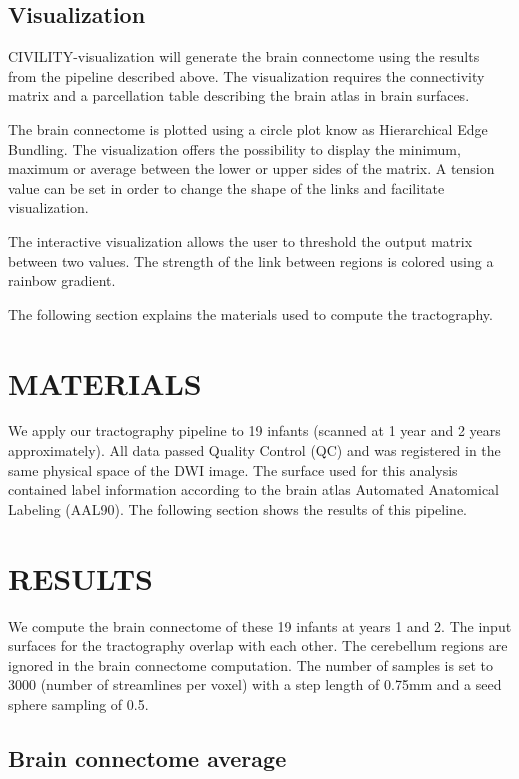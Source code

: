 \documentclass[]{spie}  %
\begin{document}
\subsection{Visualization}

CIVILITY-visualization will generate the brain connectome using the results from the pipeline described above.
The visualization requires the connectivity matrix and a parcellation table describing the brain atlas in brain surfaces. 

The brain connectome is plotted using a circle plot know as Hierarchical Edge Bundling. 
The visualization offers the possibility to display the minimum, maximum or average between the lower or upper sides of the matrix. 
A tension value can be set in order to change the shape of the links and facilitate visualization. 

The interactive visualization allows the user to threshold the output matrix between two values. 
The strength of the link between regions is colored using a rainbow gradient. 

The following section explains the materials used to compute the tractography. 

\section{MATERIALS}

We apply our tractography pipeline to 19 infants (scanned at 1 year and 2 years approximately).
All data passed Quality Control (QC) and was registered in the same physical space of the DWI image. 
The surface used for this analysis contained label information according to the brain atlas Automated Anatomical Labeling (AAL90).
The following section shows the results of this pipeline. 

\section{RESULTS} 

We compute the brain connectome of these 19 infants at years 1 and 2. The input surfaces for the tractography overlap with each other. 
The cerebellum regions are ignored in the brain connectome computation. The number of samples is set to 3000 (number of streamlines per voxel) with a step length of 0.75mm and a seed sphere sampling of 0.5. 

\subsection{Brain connectome average}
\end{document}
